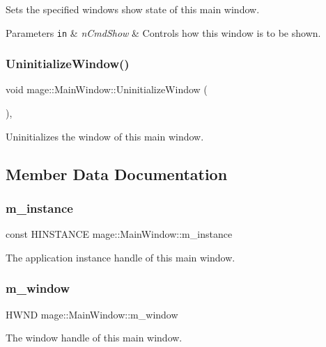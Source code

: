 Sets the specified window\textquotesingle{}s show state of this main window.


\begin{DoxyParams}[1]{Parameters}
\mbox{\tt in}  & {\em n\+Cmd\+Show} & Controls how this window is to be shown. \\
\hline
\end{DoxyParams}
\hypertarget{classmage_1_1_main_window_a229ff4bcc198ed9caf2ce54966caf746}{}\label{classmage_1_1_main_window_a229ff4bcc198ed9caf2ce54966caf746} 
\subsubsection{\texorpdfstring{Uninitialize\+Window()}{UninitializeWindow()}}
{\footnotesize\ttfamily void mage\+::\+Main\+Window\+::\+Uninitialize\+Window (\begin{DoxyParamCaption}{ }\end{DoxyParamCaption})\hspace{0.3cm}{\ttfamily [private]}, {\ttfamily [noexcept]}}

Uninitializes the window of this main window. 

\subsection{Member Data Documentation}
\hypertarget{classmage_1_1_main_window_a51dabca0b0c06652e8bbe3350186a6f8}{}\label{classmage_1_1_main_window_a51dabca0b0c06652e8bbe3350186a6f8} 
\subsubsection{\texorpdfstring{m\+\_\+instance}{m\_instance}}
{\footnotesize\ttfamily const H\+I\+N\+S\+T\+A\+N\+CE mage\+::\+Main\+Window\+::m\+\_\+instance\hspace{0.3cm}{\ttfamily [private]}}

The application instance handle of this main window. \hypertarget{classmage_1_1_main_window_abf84dff1d9634ec8ce4c12bae26cf98e}{}\label{classmage_1_1_main_window_abf84dff1d9634ec8ce4c12bae26cf98e} 
\subsubsection{\texorpdfstring{m\+\_\+window}{m\_window}}
{\footnotesize\ttfamily H\+W\+ND mage\+::\+Main\+Window\+::m\+\_\+window\hspace{0.3cm}{\ttfamily [private]}}

The window handle of this main window. 